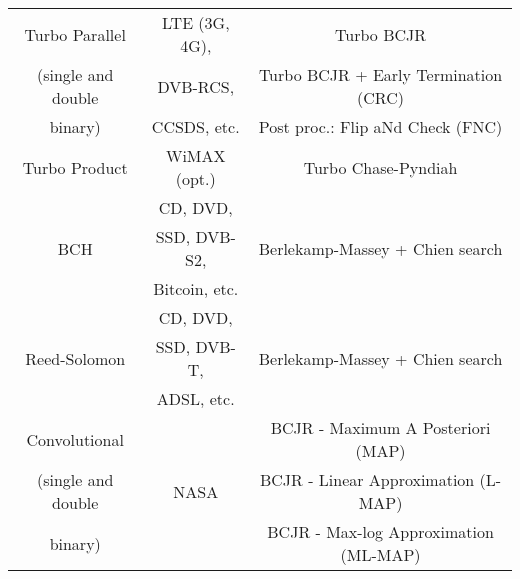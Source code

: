 \begin{table}[htp]
\begin{tabular}{ c | c | c }
  \hline
  \multirow{1}{*}{{Turbo Parallel}}       & LTE (3G, 4G),                      & Turbo BCJR                                \\
  (single and double                      & DVB-RCS,                           & Turbo BCJR + Early Termination (CRC)      \\
  binary)                                 & CCSDS, etc.                        & Post proc.: Flip aNd Check (FNC)          \\
  \hline
  \multirow{2}{*}{{Turbo Product}}        & \multirow{2}{*}{WiMAX (opt.)}      & \multirow{2}{*}{Turbo Chase-Pyndiah}      \\
                                          &                                    &                                           \\
  \hline
  \multirow{3}{*}{{BCH}}                  & CD, DVD,                           &                                           \\
                                          & SSD, DVB-S2,                       & Berlekamp-Massey + Chien search           \\
                                          & Bitcoin, etc.                      &                                           \\
  \hline
  \multirow{3}{*}{{Reed-Solomon}}         & CD, DVD,                           &                                           \\
                                          & SSD, DVB-T,                        & Berlekamp-Massey + Chien search           \\
                                          & ADSL, etc.                         &                                           \\
  \hline
  \multirow{1}{*}{{Convolutional}}        &                                    & BCJR - Maximum A Posteriori (MAP)         \\
  (single and double                      & NASA                               & BCJR - Linear Approximation (L-MAP)       \\
  binary)                                 &                                    & BCJR - Max-log Approximation (ML-MAP)     \\
  \end{tabular}
\end{table}

